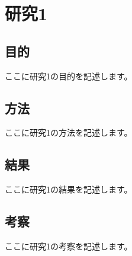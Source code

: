 \section{研究1}

\subsection{目的}
ここに研究1の目的を記述します。

\subsection{方法}
ここに研究1の方法を記述します。

\subsection{結果}
ここに研究1の結果を記述します。

\subsection{考察}
ここに研究1の考察を記述します。 